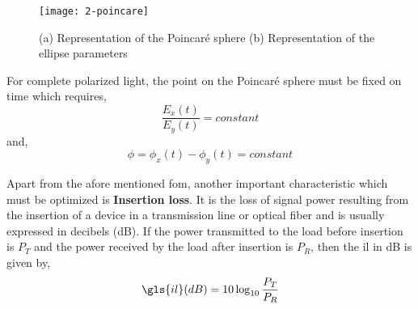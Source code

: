 \documentclass[../report.tex]{subfiles}
\begin{document}
\begin{figure}[H]
	\centering
	\texttt{[image: 2-poincare]}
	\caption{(a) Representation of the Poincaré sphere (b) Representation of the ellipse parameters \cite{flossmann_stokes_2006}}
	\label{fig:2_poincare}
\end{figure}
\noindent For complete polarized light, the point on the Poincaré sphere must be fixed on time which requires,
\begin{equation}\label{eq:polarization_condition_1}
\dfrac {E_{x}\left( t\right) } {E_{y}\left( t\right) }=constant
\end{equation}
and,
\begin{equation}\label{eq:polarization_condition_2}
\phi = \phi_{x}(t) - \phi_{y}(t)=constant
\end{equation}
\par Apart from the afore mentioned \gls{fom}, another important characteristic which must be optimized is \textbf{Insertion loss}. It is the loss of signal power resulting from the insertion of a device in a transmission line or optical fiber and is usually expressed in decibels (dB). If the power transmitted to the load before insertion is $P_T$ and the power received by the load after insertion is $P_R$, then the \gls{il} in dB is given by,
\begin{equation}\label{eq:insertion_loss}
\gls{il} (dB) = 10\log _{10} \dfrac {P_{T}} {P_{R}}
\end{equation}
  
\end{document}
